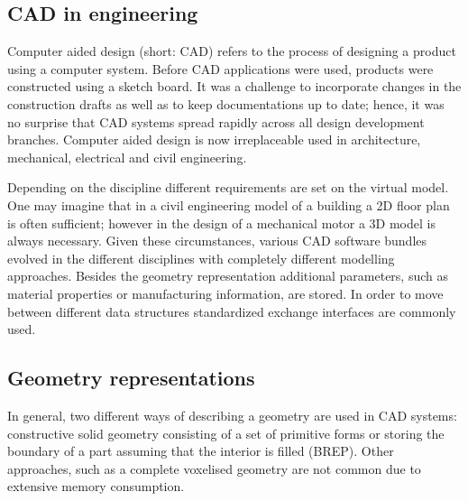 \subsection{CAD in engineering}
Computer aided design (short: CAD) refers to the process of designing a product using a computer system. Before CAD applications were used, products were constructed using a sketch board. It was a challenge to incorporate changes in the construction drafts as well as to keep documentations up to date; hence, it was no surprise that CAD systems spread rapidly across all design development branches. Computer aided design is now irreplaceable used in architecture, mechanical, electrical and civil engineering.

Depending on the discipline different requirements are set on the virtual model. One may imagine that in a civil engineering model of a building a 2D floor plan is often sufficient; however in the design of a mechanical motor a 3D model is always necessary. Given these circumstances, various CAD software bundles evolved in the different disciplines with completely different modelling approaches. Besides the geometry representation additional parameters, such as material properties or manufacturing information, are stored. In order to move between different data structures standardized exchange interfaces are commonly used.
\subsection{Geometry representations}
In general, two different ways of describing a geometry are used in CAD systems: constructive solid geometry consisting of a set of primitive forms or storing the boundary of a part assuming that the interior is filled (BREP). Other approaches, such as a complete voxelised geometry are not common due to extensive memory consumption.
